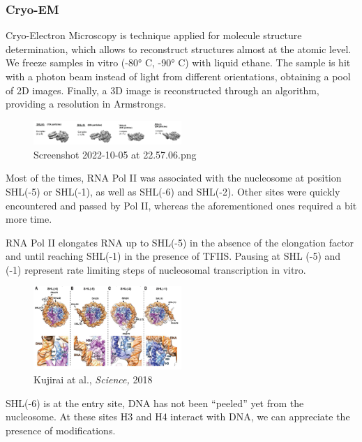\hypertarget{cryo-em}{%
\subsubsection{Cryo-EM}\label{cryo-em}}

Cryo-Electron Microscopy is technique applied for molecule structure determination, which allows to reconstruct structures almost at the atomic level. We freeze samples in vitro (-80° C, -90° C) with liquid ethane. The sample is hit with a photon beam instead of light from different orientations, obtaining a pool of 2D images. Finally, a 3D image is reconstructed through an algorithm, providing a resolution in Armstrongs.

\begin{figure}
\centering
\includegraphics[width=0.5\textwidth]{../_resources/Screenshot_2022-10-05_at_22-57-06.png}
\caption{Screenshot 2022-10-05 at 22.57.06.png}
\end{figure}

Most of the times, RNA Pol II was associated with the nucleosome at position SHL(-5) or SHL(-1), as well as SHL(-6) and SHL(-2). Other sites were quickly encountered and passed by Pol II, whereas the aforementioned ones required a bit more time. 

RNA Pol II elongates RNA up to SHL(-5) in the absence of the elongation factor and until reaching SHL(-1) in the presence of TFIIS. Pausing at SHL (-5) and (-1) represent rate limiting steps of nucleosomal transcription in vitro.

\begin{figure}
\centering
\includegraphics[width=0.5\textwidth]{../_resources/Screenshot_2022-10-05_at_22-54-39.png}
\caption{Kujirai at al., \emph{Science,} 2018}
\end{figure}

SHL(-6) is at the entry site, DNA has not been ``peeled'' yet from the nucleosome. At these sites H3 and H4 interact with DNA, we can appreciate the presence of modifications.

